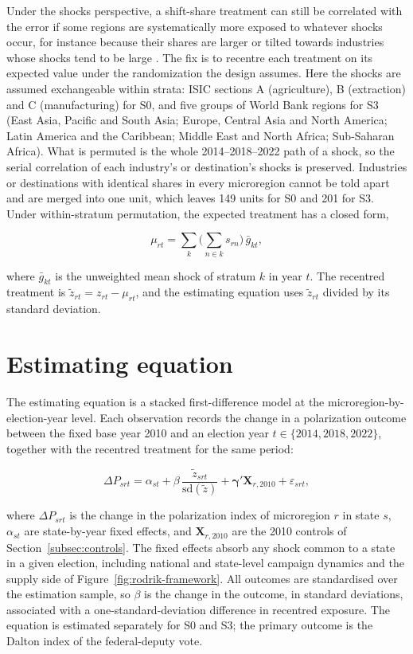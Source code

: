\documentclass[
	11pt,				%
	oneside,			%
	a4paper,			%
	english,			%
	english				%
	]{abntex2ppgsi}
\theoremstyle{plain}
\theoremstyle{remark}
\theoremstyle{plain}%
\theoremstyle{remark}%
\begin{document}
Under the shocks perspective, a shift-share treatment can still be correlated with the error if some regions are systematically more exposed to whatever shocks occur, for instance because their shares are larger or tilted towards industries whose shocks tend to be large \cite{borusyakhull2023}. The fix is to recentre each treatment on its expected value under the randomization the design assumes. Here the shocks are assumed exchangeable within strata: ISIC sections A (agriculture), B (extraction) and C (manufacturing) for S0, and five groups of World Bank regions for S3 (East Asia, Pacific and South Asia; Europe, Central Asia and North America; Latin America and the Caribbean; Middle East and North Africa; Sub-Saharan Africa). What is permuted is the whole 2014--2018--2022 path of a shock, so the serial correlation of each industry's or destination's shocks is preserved. Industries or destinations with identical shares in every microregion cannot be told apart and are merged into one unit, which leaves 149 units for S0 and 201 for S3. Under within-stratum permutation, the expected treatment has a closed form,

\begin{equation}
\mu_{rt} = \sum_{k} \Big( \sum_{n \in k} s_{rn} \Big)\, \bar{g}_{kt},
\label{eq:mu}
\end{equation}

\noindent where $\bar{g}_{kt}$ is the unweighted mean shock of stratum $k$ in year $t$. The recentred treatment is $\tilde{z}_{rt} = z_{rt} - \mu_{rt}$, and the estimating equation uses $\tilde{z}_{rt}$ divided by its standard deviation.

\section{Estimating equation}

The estimating equation is a stacked first-difference model at the microregion-by-election-year level. Each observation records the change in a polarization outcome between the fixed base year 2010 and an election year $t \in \{2014, 2018, 2022\}$, together with the recentred treatment for the same period:

\begin{equation}
    \Delta P_{srt} = \alpha_{st} + \beta\, \frac{\tilde{z}_{srt}}{\mathrm{sd}(\tilde{z})} + \boldsymbol{\gamma}' \mathbf{X}_{r,2010} + \varepsilon_{srt},
    \label{eq:eq2}
\end{equation}

\noindent where $\Delta P_{srt}$ is the change in the polarization index of microregion $r$ in state $s$, $\alpha_{st}$ are state-by-year fixed effects, and $\mathbf{X}_{r,2010}$ are the 2010 controls of Section~\ref{subsec:controls}. The fixed effects absorb any shock common to a state in a given election, including national and state-level campaign dynamics and the supply side of Figure~\ref{fig:rodrik-framework}. All outcomes are standardised over the estimation sample, so $\beta$ is the change in the outcome, in standard deviations, associated with a one-standard-deviation difference in recentred exposure. The equation is estimated separately for S0 and S3; the primary outcome is the Dalton index of the federal-deputy vote.
\end{document}
